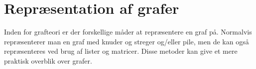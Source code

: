 \section{Repræsentation af grafer}
Inden for grafteori er der forskellige måder at repræsentere en graf på. Normalvis repræsenterer man en graf med knuder og streger og/eller pile, men de kan også repræsenteres ved brug af lister og matricer. Disse metoder kan give et mere praktisk overblik over grafer.
